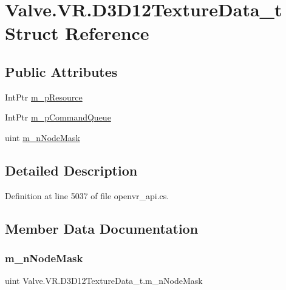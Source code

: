 \hypertarget{struct_valve_1_1_v_r_1_1_d3_d12_texture_data__t}{}\section{Valve.\+V\+R.\+D3\+D12\+Texture\+Data\+\_\+t Struct Reference}
\label{struct_valve_1_1_v_r_1_1_d3_d12_texture_data__t}
\subsection*{Public Attributes}
\begin{DoxyCompactItemize}
\item 
Int\+Ptr \mbox{\hyperlink{struct_valve_1_1_v_r_1_1_d3_d12_texture_data__t_a057ca734b24c966aa15bfcf48e3c17b6}{m\+\_\+p\+Resource}}
\item 
Int\+Ptr \mbox{\hyperlink{struct_valve_1_1_v_r_1_1_d3_d12_texture_data__t_aba9327e24246b3d5141975bca891c2a1}{m\+\_\+p\+Command\+Queue}}
\item 
uint \mbox{\hyperlink{struct_valve_1_1_v_r_1_1_d3_d12_texture_data__t_a3dc67dd18fd019861f971dccea10866a}{m\+\_\+n\+Node\+Mask}}
\end{DoxyCompactItemize}


\subsection{Detailed Description}


Definition at line 5037 of file openvr\+\_\+api.\+cs.



\subsection{Member Data Documentation}
\mbox{\label{struct_valve_1_1_v_r_1_1_d3_d12_texture_data__t_a3dc67dd18fd019861f971dccea10866a}} 
\subsubsection{\texorpdfstring{m\_nNodeMask}{m\_nNodeMask}}
{\footnotesize\ttfamily uint Valve.\+V\+R.\+D3\+D12\+Texture\+Data\+\_\+t.\+m\+\_\+n\+Node\+Mask}



